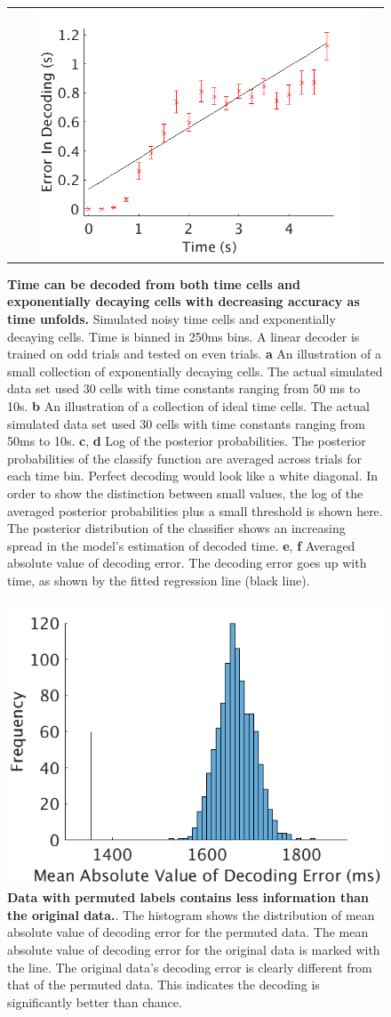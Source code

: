 \documentclass{apa}
\begin{document}
\begin{figure}
\begin{tabular}[t]{l c l c}
 & &
\includegraphics[width=.4\linewidth]{figs/AbsErrorTimeCells_20noiseV3.png}
\end{tabular}
\caption{\textbf{Time can be decoded from both time cells and exponentially
decaying cells with decreasing accuracy as time unfolds.} Simulated noisy
time cells and exponentially decaying cells.  Time is binned in 250ms bins.  A
linear decoder is trained on odd trials and tested on even trials.  \textbf{a}
An illustration of a small collection of exponentially decaying cells.  The
actual simulated data set used 30 cells with time constants ranging from 50 ms
to 10s. \textbf{b} An illustration of a collection of ideal time cells.  The
actual simulated data set used 30 cells with time constants ranging from 50ms
to 10s.  \textbf{c}, \textbf{d} Log of the posterior probabilities.  The
posterior probabilities of the classify function are averaged across trials
for each time bin.  Perfect decoding would look like a white diagonal.  In
order to show the distinction between small values, the log of the averaged
posterior probabilities plus a small threshold is shown here.  The posterior
distribution of the classifier shows an increasing spread in the model's
estimation of decoded time. \textbf{e}, \textbf{f} Averaged absolute value of
decoding error.  The decoding error goes up with time, as shown by the fitted
regression line (black line). }
\label{fig:LDA_simulated} 
\end{figure}

\begin{figure}
\includegraphics[width=.7\linewidth]{figs/Permutest.png}
\caption{\textbf{Data with permuted labels contains less information than the original data.}. 
The histogram shows the distribution of mean absolute value of decoding error for the permuted data.  
The mean absolute value of decoding error for the original data is marked with the line.  
The original data's decoding error is clearly different from that of the permuted data.  This indicates the decoding is significantly better than chance.}
\label{fig:permutest}
\end{figure}
\end{document}
